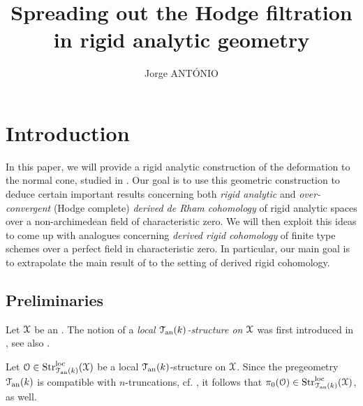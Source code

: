 \documentclass[10pt,a4paper,reqno]{amsart} %
\theoremstyle{plain}
\theoremstyle{definition}
\theoremstyle{remark}
\numberwithin{equation}{section}
\begin{document}
\title{Spreading out the Hodge filtration in rigid analytic geometry}

\author{Jorge ANT\'ONIO}
\address{Jorge ANT\'ONIO, IRMA, UMR 7501
7 rue René-Descartes
67084 Strasbourg Cedex}


\begin{abstract}

\end{abstract}

\maketitle

\tableofcontents

\section{Introduction}

In this paper, we will provide a rigid analytic construction of the deformation to the normal cone, studied in \cite{Gaitsgory_Study_II}.
Our goal is to use this geometric construction to deduce certain important results concerning both \emph{rigid analytic} and
\emph{over-convergent} (Hodge complete)
\emph{derived de Rham cohomology} of rigid analytic spaces over a non-archimedean field of characteristic zero.
We will then exploit this ideas to come up with analogues concerning \emph{derived rigid cohomology} of finite type schemes over a perfect field
in characteristic zero. In particular, our main goal is to extrapolate the main result of \cite{Bhatt_Derived_Completions} to the setting of
derived rigid cohomology.

\subsection{Preliminaries}
Let $\mathcal X$ be an \inftopos. The notion of a \emph{local $\mathcal T_{\mathrm{an}}(k)$-structure on $\mathcal X$} was first introduced in \cite[Definition 2.4]{Porta_Yu_Derived_non-archimedean_analytic_spaces},
see also \cite[\S 2]{antonio2018p}.

Let  $\mathcal O \in \mathrm{Str}^\mathrm{loc}_{\mathcal T_{\mathrm{an}}(k)}(\mathcal X)$ be a local $\mathcal T_{\mathrm{an}}(k)$-structure on $\mathcal X$. Since the pregeometry $\mathcal T_{\mathrm{an}}(k)$ is compatible
with $n$-truncations, cf. \cite[Theorem 3.23]{Porta_Yu_Derived_non-archimedean_analytic_spaces}, it follows that
$\pi_0(\mathcal O) \in \mathrm{Str}^\mathrm{loc}_{\mathcal T_{\mathrm{an}}(k)}(\mathcal X)$, as well.
\end{document}
